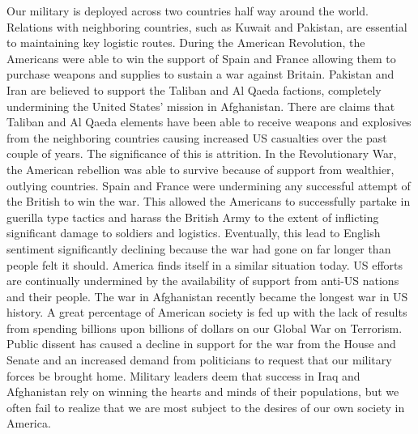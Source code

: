 Our military is deployed across two countries half way around the world.
Relations with neighboring countries, such as Kuwait and Pakistan, are
essential to maintaining key logistic routes.  During the American Revolution,
the Americans were able to win the support of Spain and France allowing them to
purchase weapons and supplies to sustain a war against Britain.  Pakistan and
Iran are believed to support the Taliban and Al Qaeda factions, completely
undermining the United States’ mission in Afghanistan.  There are claims that
Taliban and Al Qaeda elements have been able to receive weapons and explosives
from the neighboring countries causing increased US casualties over the past
couple of years.  The significance of this is attrition.  In the Revolutionary
War, the American rebellion was able to survive because of support from
wealthier, outlying countries.  Spain and France were undermining any
successful attempt of the British to win the war.  This allowed the Americans
to successfully partake in guerilla type tactics and harass the British Army to
the extent of inflicting significant damage to soldiers and logistics.
Eventually, this lead to English sentiment significantly declining because the
war had gone on far longer than people felt it should.   America finds itself
in a similar situation today.  US efforts are continually undermined by the
availability of support from anti-US nations and their people.  The war in
Afghanistan recently became the longest war in US history.  A great percentage
of American society is fed up with the lack of results from spending billions
upon billions of dollars on our Global War on Terrorism.  Public dissent has
caused a decline in support for the war from the House and Senate and an
increased demand from politicians to request that our military forces be
brought home.  Military leaders deem that success in Iraq and Afghanistan rely
on winning the hearts and minds of their populations, but we often fail to
realize that we are most subject to the desires of our own society in America.     


